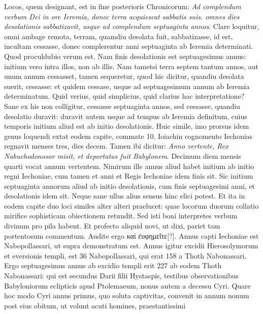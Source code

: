Locos, quem designant, est in fine posterioris Chronicorum:
\textit{Ad complendum verbum Dei in ore Ieremia,
 donec terra acquiescat sabbatis
suis. omnes dies desolationis sabbatizavit, usque ad complendum
septuaginta annos}.
Clare loquitur, omni ambage remota, terram,
quamdiu desolata fuit, sabbatizasse, id est, incultam cessasse, donec
complerentur anni septuaginta ab Ieremia determinati.
%
Quod
proculdubio verum est.
Nam finis desolationis est septuagesimus
annus: initium vero intra illos, non ab illis.
Nam tametsi terra septem
tantum annos, aut unum annum cessasset, tamen sequeretur,
quod hic dicitur, quandiu desolata suerit, cessasse: et quidem cessase,
usque ad septuagesimum annum ab Ieremia determinatum.
Quid verius, quid simplicius, quid clarius hac interpretatione?
Sane
ex his non colligitur, cessasse septuaginta annos, sed cessasse,
quandiu desolatio duravit: duravit autem usque ad tempus ab Ieremia
definitum, cuius temporis initium aliud est ab initio desolationis.
Huic simile, imo prorsus idem genus loquendi extat eodem capite,
commate 10.
Ioiachin cognomento Iechonias regnavit menses tres,
dies decem.
Tamen ibi dicitur: \textit{Anno vertente, Rex Nabuchodonosor
misit, et deportatus fuit Babylonem}.
Decimum diem mensis quarti
vocat annum vertentem.
Nimirum ille annus aliud habet initium
ab initio regni Iechoniae, cum tamen et anni et Regis Iechoniae
idem finis sit.
Sic initium septuaginta annorum aliud ab initio desolationis,
cum finis septuagesimi anni, et desolationis idem sit.
Neque sane ullus alius sensus hinc elici potest.
Et ita in eodem capite
duo loci similes alter alteri praelucet: quae locorum duorum
collatio mirifice sophisticam obiectionem retundit.
Sed isti boni
interpretes verbum divinum pro pila habent.
Et profecto aliquid
novi, ut dixi, pariet tam portentosum commentum.
Audite
ergo \textgreek{καὶ ἐυφημεῖτε[?]}.
Annus capti Iechoniae est  Nabopollassari,
ut supra demonstratum est.
Annus igitur excidii Hierosolymorum
et eversionis templi, est 36 Nabopollassari, qui erat 158 a
Thoth Nabonassari.
Ergo septuagesimus annus ab excidio templi
erit 227 ab eodem Thoth Nabonassari: qui est secundus Darii filii
Hystaspis, testibus observationibus Babyloniorum eclipticis apud
Ptolemaeum, nonus autem a decessu Cyri.
Quare hoc modo
Cyri annus primus, quo soluta captivitas, convenit in annum
nonum post eius obitum, ut volunt acuti homines, praestantissimi
